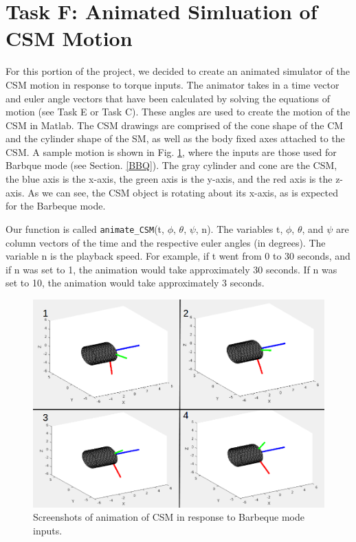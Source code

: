 \documentclass{article}
\begin{document}
\section{Task F: Animated Simluation of CSM Motion}
For this portion of the project, we decided to create an animated simulator of the CSM motion in response to torque inputs. The animator takes in a time vector and euler angle vectors that have been calculated by solving the equations of motion (see Task E or Task C). These angles are used to create the motion of the CSM in Matlab. The CSM drawings are comprised of the cone shape of the CM and the cylinder shape of the SM, as well as the body fixed axes attached to the CSM. A sample motion is shown in Fig. \ref{fig:csmmotion}, where the inputs are those used for Barbque mode (see Section. \ref{BBQ}). The gray cylinder and cone are the CSM, the blue axis is the x-axis, the green axis is the y-axis, and the red axis is the z-axis. As we can see, the CSM object is rotating about its x-axis, as is expected for the Barbeque mode.

Our function is called \verb|animate_CSM|(t, $\phi$, $\theta$, $\psi$, n). The variables t, $\phi$, $\theta$, and $\psi$ are column vectors of the time and the respective euler angles (in degrees). The variable n is the playback speed. For example, if t went from 0 to 30 seconds, and if n was set to 1, the animation would take approximately 30 seconds. If n was set to 10, the animation would take approximately 3 seconds. 

\begin{figure}[H]
  \includegraphics[width=\linewidth]{CSMmotion.png}
  \caption{Screenshots of animation of CSM in response to Barbeque mode inputs.}
  \label{fig:csmmotion}
\end{figure}
\end{document}
